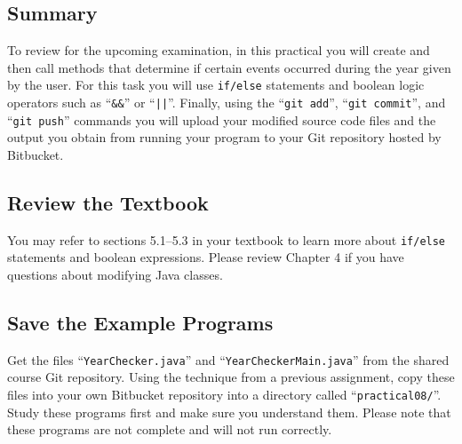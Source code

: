 



\subsection*{Summary}
\vspace*{-.05in}

To review for the upcoming examination, in this practical you will create and then call methods that determine if
certain events occurred during the year given by the user. For this task you will use {\tt if/else} statements and
boolean logic operators such as ``{\tt \&\&}'' or ``{\tt ||}''.  Finally, using the ``{\tt git add}'', ``{\tt git
commit}'', and ``{\tt git push}'' commands you will upload your modified source code files and the output you obtain
from running your program to your Git repository hosted by Bitbucket.

\vspace*{-.1in}
\subsection*{Review the Textbook}
\vspace*{-.05in}

You may refer to sections 5.1--5.3 in your textbook to learn more about {\tt if/else} statements and boolean
expressions.  Please review Chapter 4 if you have questions about modifying Java classes.

\vspace*{-.1in}
\subsection*{Save the Example Programs}
\vspace*{-.05in}

Get the files ``{\tt YearChecker.java}'' and ``{\tt YearCheckerMain.java}'' from the shared course Git repository. Using
the technique from a previous assignment, copy these files into your own Bitbucket repository into a directory called
``{\tt practical08/}''. Study these programs first and make sure you understand them. Please note that these programs
are not complete and will not run correctly.

\vspace*{-.1in}
